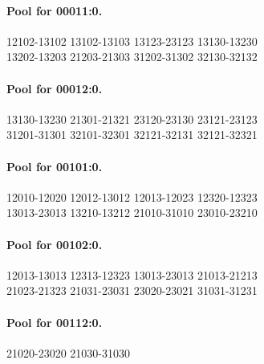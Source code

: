 \documentclass[11pt]{article}
\theoremstyle{remark}
\numberwithin{equation}{section}
\numberwithin{table}{section}
\begin{document}
\paragraph{Pool for 00011:0.}
\begingroup\footnotesize\ttfamily\begin{flushleft}
12102-13102 13102-13103 13123-23123 13130-13230\\
13202-13203 21203-21303 31202-31302 32130-32132\\
\end{flushleft}\endgroup
\paragraph{Pool for 00012:0.}
\begingroup\footnotesize\ttfamily\begin{flushleft}
13130-13230 21301-21321 23120-23130 23121-23123\\
31201-31301 32101-32301 32121-32131 32121-32321\\
\end{flushleft}\endgroup
\paragraph{Pool for 00101:0.}
\begingroup\footnotesize\ttfamily\begin{flushleft}
12010-12020 12012-13012 12013-12023 12320-12323\\
13013-23013 13210-13212 21010-31010 23010-23210\\
\end{flushleft}\endgroup
\paragraph{Pool for 00102:0.}
\begingroup\footnotesize\ttfamily\begin{flushleft}
12013-13013 12313-12323 13013-23013 21013-21213\\
21023-21323 21031-23031 23020-23021 31031-31231\\
\end{flushleft}\endgroup
\paragraph{Pool for 00112:0.}
\begingroup\footnotesize\ttfamily\begin{flushleft}
21020-23020 21030-31030\\
\end{flushleft}\endgroup
\end{document}
